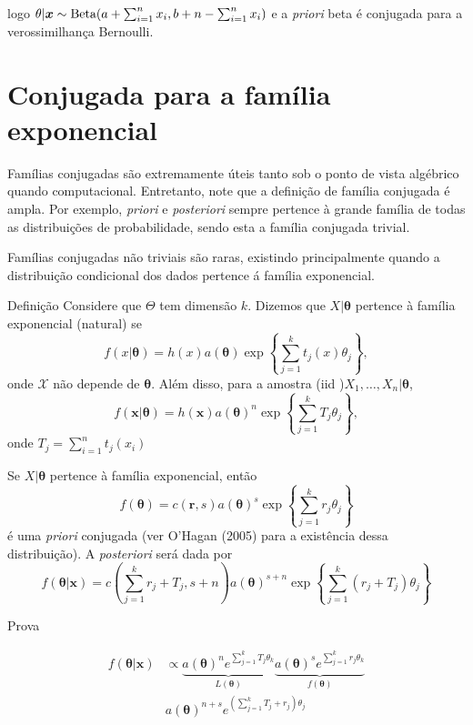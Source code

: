 \documentclass[
  letterpaper,
  DIV=11,
  numbers=noendperiod]{scrreprt}
\theoremstyle{definition}
\theoremstyle{definition}
\theoremstyle{remark}
\begin{document}
logo
\(\theta|\boldsymbol{x}\sim\hbox{Beta}(a+\sum_{i=1}^{n}x_i,b+n-\sum_{i=1}^{n}x_i)\)
e a \emph{priori} beta é conjugada para a verossimilhança Bernoulli.

\hypertarget{conjugada-para-a-famuxedlia-exponencial}{%
\section{Conjugada para a família
exponencial}\label{conjugada-para-a-famuxedlia-exponencial}}

Famílias conjugadas são extremamente úteis tanto sob o ponto de vista
algébrico quando computacional. Entretanto, note que a definição de
família conjugada é ampla. Por exemplo, \emph{priori} e
\emph{posteriori} sempre pertence à grande família de todas as
distribuições de probabilidade, sendo esta a família conjugada trivial.

Famílias conjugadas não triviais são raras, existindo principalmente
quando a distribuição condicional dos dados pertence á família
exponencial.

Definição Considere que \(\Theta\) tem dimensão \(k\). Dizemos que
\(X|\boldsymbol{\theta}\) pertence à família exponencial (natural) se
\[f(x|\boldsymbol{\theta})=h(x)a(\boldsymbol{\theta})\exp\left\{\sum_{j=1}^k t_j(x)\theta_j\right\},\]
onde \(\mathcal{X}\) não depende de \(\boldsymbol{\theta}\). Além disso,
para a amostra (iid )\(X_1,\ldots,X_n|\boldsymbol{\theta}\),
\[f(\boldsymbol{x}|\boldsymbol{\theta})=h(\boldsymbol{x})a(\boldsymbol{\theta})^n\exp\left\{\sum_{j=1}^k T_j\theta_j\right\},\]
onde \(T_j=\sum_{i=1}^{n}t_j(x_i)\)

Se \(X|\boldsymbol{\theta}\) pertence à família exponencial, então
\[f(\boldsymbol{\theta})=c(\boldsymbol{r},s)a(\boldsymbol{\theta})^s\exp\left\{\sum_{j=1}^k r_j\theta_j\right\}\]
é uma \emph{priori} conjugada (ver O'Hagan (2005) para a existência
dessa distribuição). A \emph{posteriori} será dada por
\[f(\boldsymbol{\theta}|\boldsymbol{x})=c\left(\sum_{j=1}^k r_j+T_j,s+n\right)a(\boldsymbol{\theta})^{s+n}\exp\left\{\sum_{j=1}^k(r_j+T_j)\theta_j\right\}\]

Prova

\[\begin{align}
f(\boldsymbol{\theta}|\boldsymbol{x})&\varpropto \underbrace{a(\boldsymbol{\theta})^ne^{\sum_{j=1}^kT_j\theta_k}}_{L(\boldsymbol{\theta})}\underbrace{a(\boldsymbol{\theta})^s e^{\sum_{j=1}^k r_j\theta_k}}_{f(\boldsymbol{\theta})}\\
&a(\boldsymbol{\theta})^{n+s}e^{(\sum_{j=1}^{k}T_j+r_j)\theta_j}
\end{align}\]
\end{document}
